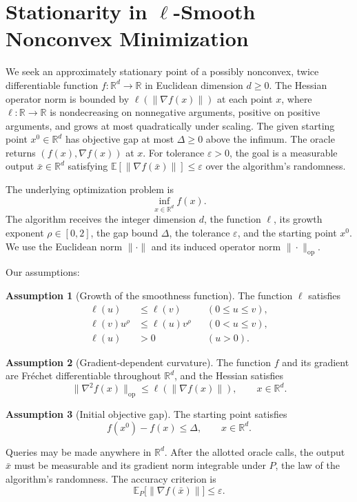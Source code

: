 \documentclass[10pt]{article}
\theoremstyle{definition}
\newtheorem{assumption}{Assumption}
\begin{document}
\section*{Stationarity in $\ell$-Smooth Nonconvex Minimization}
We seek an approximately stationary point of a possibly nonconvex, twice differentiable function $f:\mathbb{R}^d\to\mathbb{R}$ in Euclidean dimension $d\geq 0$. The Hessian operator norm is bounded by $\ell(\|\nabla f(x)\|)$ at each point $x$, where $\ell:\mathbb{R}\to\mathbb{R}$ is nondecreasing on nonnegative arguments, positive on positive arguments, and grows at most quadratically under scaling. The given starting point $x^0\in\mathbb{R}^d$ has objective gap at most $\Delta\geq 0$ above the infimum. The oracle returns $(f(x),\nabla f(x))$ at $x$. For tolerance $\varepsilon>0$, the goal is a measurable output $\bar{x}\in\mathbb{R}^d$ satisfying $\mathbb{E}[\|\nabla f(\bar{x})\|]\leq\varepsilon$ over the algorithm's randomness.

The underlying optimization problem is
\[
\inf_{x\in\mathbb{R}^d} f(x).
\]
The algorithm receives the integer dimension $d$, the function $\ell$, its growth exponent $\rho\in[0,2]$, the gap bound $\Delta$, the tolerance $\varepsilon$, and the starting point $x^0$. We use the Euclidean norm $\|\cdot\|$ and its induced operator norm $\|\cdot\|_{\mathrm{op}}$.

Our assumptions:
\begin{assumption}[Growth of the smoothness function]
The function $\ell$ satisfies
\[
\begin{aligned}
\ell(u)&\leq\ell(v) &&(0\leq u\leq v),\\
\ell(v)u^\rho&\leq\ell(u)v^\rho &&(0<u\leq v),\\
\ell(u)&>0 &&(u>0).
\end{aligned}
\]
\end{assumption}

\begin{assumption}[Gradient-dependent curvature]
The function $f$ and its gradient are Fr\'echet differentiable throughout $\mathbb{R}^d$, and the Hessian satisfies
\[
\|\nabla^2 f(x)\|_{\mathrm{op}}\leq\ell(\|\nabla f(x)\|),\qquad x\in\mathbb{R}^d.
\]
\end{assumption}

\begin{assumption}[Initial objective gap]
The starting point satisfies
\[
f(x^0)-f(x)\leq\Delta,\qquad x\in\mathbb{R}^d.
\]
\end{assumption}

Queries may be made anywhere in $\mathbb{R}^d$. After the allotted oracle calls, the output $\bar{x}$ must be measurable and its gradient norm integrable under $P$, the law of the algorithm's randomness. The accuracy criterion is
\[
\mathbb{E}_P\bigl[\|\nabla f(\bar{x})\|\bigr]\leq\varepsilon.
\]
\end{document}
